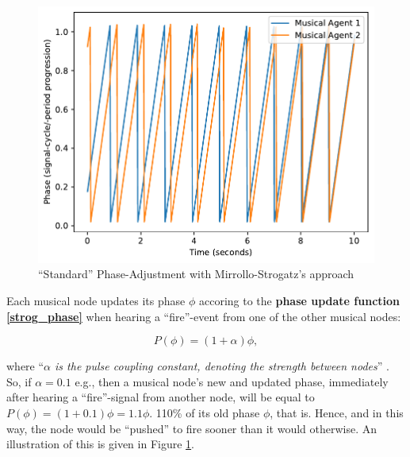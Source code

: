 			\begin{figure}[h]
				\centering
				\includegraphics[width=0.9\linewidth]{Assets/Figures/MirolloStrogatzPhaseAdjustment.pdf}
				\caption{``Standard'' Phase-Adjustment with Mirrollo-Strogatz's approach}
				\label{fig:strog_phase}
			\end{figure}
			
			Each musical node updates its phase $\phi$ accoring to the \textbf{phase update function \eqref{strog_phase}} when hearing a ``fire''-event from one of the other musical nodes:
			
			\begin{equation}\label{strog_phase}
			P(\phi) = (1 + \alpha)\phi	,
			\end{equation}
			
			where ``\textit{$\alpha$ is the pulse coupling constant, denoting the strength between nodes}'' \cite{nymoen_synch}. So, if $\alpha = 0.1$ e.g., then a musical node's new and updated phase, immediately after hearing a ``fire''-signal from another node, will be equal to $P(\phi) = (1 + 0.1)\phi = 1.1\phi$. 110\% of its old phase $\phi$, that is. Hence, and in this way, the node would be ``pushed'' to fire sooner than it would otherwise. An illustration of this is given in Figure \ref{fig:strog_phase}.
			
			
			
